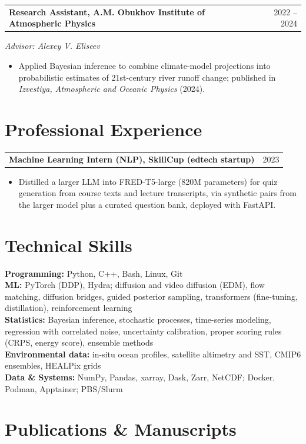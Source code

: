 \documentclass[letterpaper,10pt]{article}
\makeatletter
\newcommand{\entry}[2]{%
  \noindent\begin{tabularx}{\textwidth}{@{}X r@{}}%
    \textbf{#1} & #2 \\
  \end{tabularx}\par\nopagebreak
}
\makeatother
\begin{document}
\smallskip
{}
\entry{Research Assistant, A.M. Obukhov Institute of Atmospheric Physics}{2022 -- 2024}
\textit{Advisor: Alexey V. Eliseev}
\begin{itemize}
    \item Applied Bayesian inference to combine climate-model projections into probabilistic estimates of 21st-century river runoff change; published in \textit{Izvestiya, Atmospheric and Oceanic Physics} (2024).
\end{itemize}

\section{Professional Experience}

\entry{Machine Learning Intern (NLP), SkillCup \textnormal{(edtech startup)}}{2023}
\begin{itemize}
    \item Distilled a larger LLM into FRED-T5-large (820M parameters) for quiz generation from course texts and lecture transcripts, via synthetic pairs from the larger model plus a curated question bank, deployed with FastAPI.
\end{itemize}

\section{Technical Skills}

\textbf{Programming:} Python, C++, Bash, Linux, Git\\
\textbf{ML:} PyTorch (DDP), Hydra; diffusion and video diffusion (EDM), flow matching, diffusion bridges, guided posterior sampling, transformers (fine-tuning, distillation), reinforcement learning\\
\textbf{Statistics:} Bayesian inference, stochastic processes, time-series modeling, regression with correlated noise, uncertainty calibration, proper scoring rules (CRPS, energy score), ensemble methods\\
\textbf{Environmental data:} in-situ ocean profiles, satellite altimetry and SST, CMIP6 ensembles, HEALPix grids\\
\textbf{Data \& Systems:} NumPy, Pandas, xarray, Dask, Zarr, NetCDF; Docker, Podman, Apptainer; PBS/Slurm

\section{Publications \& Manuscripts}
\end{document}

